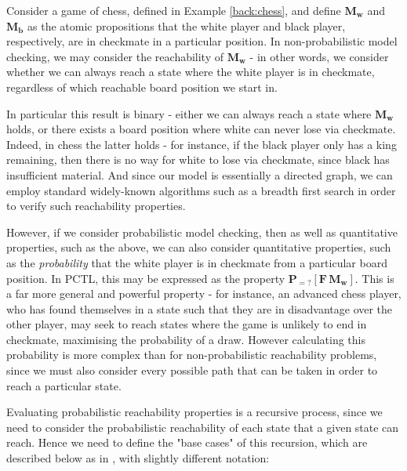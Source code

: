 \begin{example}
\label{back:chess-reachability}
    Consider a game of chess, defined in Example \ref{back:chess}, and define $\mathbf{M_w}$ and $\mathbf{M_b}$ as the atomic propositions that the white player and black player, respectively, are in checkmate in a particular position. In non-probabilistic model checking, we may consider the reachability of $\mathbf{M_w}$ - in other words, we consider whether we can always reach a state where the white player is in checkmate, regardless of which reachable board position we start in.
    
    In particular this result is binary - either we can always reach a state where $\mathbf{M_w}$ holds, or there exists a board position where white can never lose via checkmate. Indeed, in chess the latter holds - for instance, if the black player only has a king remaining, then there is no way for white to lose via checkmate, since black has insufficient material. And since our model is essentially a directed graph, we can employ standard widely-known algorithms such as a breadth first search in order to verify such reachability properties.

    However, if we consider probabilistic model checking, then as well as quantitative properties, such as the above, we can also consider quantitative properties, such as the \emph{probability} that the white player is in checkmate from a particular board position. In PCTL, this may be expressed as the property $\mathbf{P}_{=?} [\mathbf{F} \, \mathbf{M_w}]$. This is a far more general and powerful property - for instance, an advanced chess player, who has found themselves in a state such that they are in disadvantage over the other player, may seek to reach states where the game is unlikely to end in checkmate, maximising the probability of a draw. However calculating this probability is more complex than for non-probabilistic reachability problems, since we must also consider every possible path that can be taken in order to reach a particular state.

\end{example}

Evaluating probabilistic reachability properties is a recursive process, since we need to consider the probabilistic reachability of each state that a given state can reach. Hence we need to define the "base cases" of this recursion, which are described below as in \cite{kwiatkowska_stochastic_2007}, with slightly different notation:

